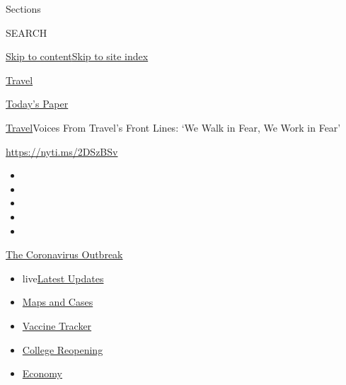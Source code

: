 Sections

SEARCH

\protect\hyperlink{site-content}{Skip to
content}\protect\hyperlink{site-index}{Skip to site index}

\href{https://www.nytimes3xbfgragh.onion/section/travel}{Travel}

\href{https://myaccount.nytimes3xbfgragh.onion/auth/login?response_type=cookie\&client_id=vi}{}

\href{https://www.nytimes3xbfgragh.onion/section/todayspaper}{Today's
Paper}

\href{/section/travel}{Travel}\textbar{}Voices From Travel's Front
Lines: `We Walk in Fear, We Work in Fear'

\url{https://nyti.ms/2DSzBSv}

\begin{itemize}
\item
\item
\item
\item
\item
\end{itemize}

\href{https://www.nytimes3xbfgragh.onion/news-event/coronavirus?action=click\&pgtype=Article\&state=default\&region=TOP_BANNER\&context=storylines_menu}{The
Coronavirus Outbreak}

\begin{itemize}
\tightlist
\item
  live\href{https://www.nytimes3xbfgragh.onion/2020/08/04/world/coronavirus-cases.html?action=click\&pgtype=Article\&state=default\&region=TOP_BANNER\&context=storylines_menu}{Latest
  Updates}
\item
  \href{https://www.nytimes3xbfgragh.onion/interactive/2020/us/coronavirus-us-cases.html?action=click\&pgtype=Article\&state=default\&region=TOP_BANNER\&context=storylines_menu}{Maps
  and Cases}
\item
  \href{https://www.nytimes3xbfgragh.onion/interactive/2020/science/coronavirus-vaccine-tracker.html?action=click\&pgtype=Article\&state=default\&region=TOP_BANNER\&context=storylines_menu}{Vaccine
  Tracker}
\item
  \href{https://www.nytimes3xbfgragh.onion/2020/08/02/us/covid-college-reopening.html?action=click\&pgtype=Article\&state=default\&region=TOP_BANNER\&context=storylines_menu}{College
  Reopening}
\item
  \href{https://www.nytimes3xbfgragh.onion/live/2020/08/04/business/stock-market-today-coronavirus?action=click\&pgtype=Article\&state=default\&region=TOP_BANNER\&context=storylines_menu}{Economy}
\end{itemize}

